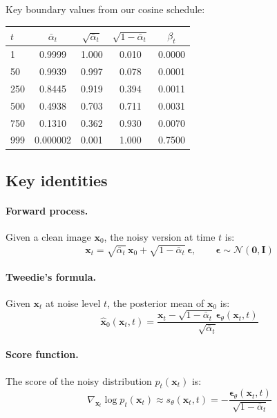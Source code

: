 \documentclass[11pt]{article}
\newcommand{\xb}{\mathbf{x}}
\newcommand{\eb}{\boldsymbol{\epsilon}}
\newcommand{\Ib}{\mathbf{I}}
\newcommand{\alphabar}{\bar{\alpha}}
\begin{document}
Key boundary values from our cosine schedule:
\begin{center}
\begin{tabular}{lcccc}
\toprule
$t$ & $\alphabar_t$ & $\sqrt{\alphabar_t}$ & $\sqrt{1-\alphabar_t}$ & $\beta_t$ \\
\midrule
1   & 0.9999 & 1.000  & 0.010  & 0.0000 \\
50  & 0.9939 & 0.997  & 0.078  & 0.0001 \\
250 & 0.8445 & 0.919  & 0.394  & 0.0011 \\
500 & 0.4938 & 0.703  & 0.711  & 0.0031 \\
750 & 0.1310 & 0.362  & 0.930  & 0.0070 \\
999 & 0.000002 & 0.001 & 1.000 & 0.7500 \\
\bottomrule
\end{tabular}
\end{center}

\subsection{Key identities}

\paragraph{Forward process.}
Given a clean image $\xb_0$, the noisy version at time $t$ is:
\begin{equation}
    \xb_t = \sqrt{\alphabar_t}\, \xb_0 + \sqrt{1 - \alphabar_t}\, \eb,
    \qquad \eb \sim \mathcal{N}(\mathbf{0}, \Ib)
    \label{eq:forward}
\end{equation}

\paragraph{Tweedie's formula.}
Given $\xb_t$ at noise level $t$, the posterior mean of $\xb_0$ is:
\begin{equation}
    \hat{\xb}_0(\xb_t, t)
    = \frac{\xb_t - \sqrt{1 - \alphabar_t}\, \eb_\theta(\xb_t, t)}{\sqrt{\alphabar_t}}
    \label{eq:tweedie}
\end{equation}

\paragraph{Score function.}
The score of the noisy distribution $p_t(\xb_t)$ is:
\begin{equation}
    \nabla_{\xb_t} \log p_t(\xb_t)
    \approx s_\theta(\xb_t, t)
    = -\frac{\eb_\theta(\xb_t, t)}{\sqrt{1 - \alphabar_t}}
    \label{eq:score}
\end{equation}
\end{document}
